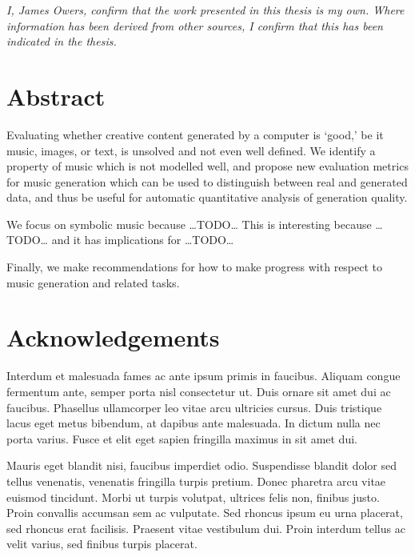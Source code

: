 \documentclass[12pt,a4paper,]{report}
\begin{document}
\noindent
\textit{I, James Owers, confirm that the work presented in this thesis is my own. Where
information has been derived from other sources, I confirm that this has been indicated
in the thesis.} \vspace*{\fill}  \newpage

\hypertarget{abstract}{%
\chapter*{Abstract}\label{abstract}}

Evaluating whether creative content generated by a computer is `good,'
be it music, images, or text, is unsolved and not even well defined. We
identify a property of music which is not modelled well, and propose new
evaluation metrics for music generation which can be used to distinguish
between real and generated data, and thus be useful for automatic
quantitative analysis of generation quality.

We focus on symbolic music because \ldots TODO\ldots{} This is
interesting because \ldots TODO\ldots{} and it has implications for
\ldots TODO\ldots{}

Finally, we make recommendations for how to make progress with respect
to music generation and related tasks.

\setcounter{page}{1}

\hypertarget{acknowledgements}{%
\chapter*{Acknowledgements}\label{acknowledgements}}

Interdum et malesuada fames ac ante ipsum primis in faucibus. Aliquam
congue fermentum ante, semper porta nisl consectetur ut. Duis ornare sit
amet dui ac faucibus. Phasellus ullamcorper leo vitae arcu ultricies
cursus. Duis tristique lacus eget metus bibendum, at dapibus ante
malesuada. In dictum nulla nec porta varius. Fusce et elit eget sapien
fringilla maximus in sit amet dui.

Mauris eget blandit nisi, faucibus imperdiet odio. Suspendisse blandit
dolor sed tellus venenatis, venenatis fringilla turpis pretium. Donec
pharetra arcu vitae euismod tincidunt. Morbi ut turpis volutpat,
ultrices felis non, finibus justo. Proin convallis accumsan sem ac
vulputate. Sed rhoncus ipsum eu urna placerat, sed rhoncus erat
facilisis. Praesent vitae vestibulum dui. Proin interdum tellus ac velit
varius, sed finibus turpis placerat.
\end{document}
